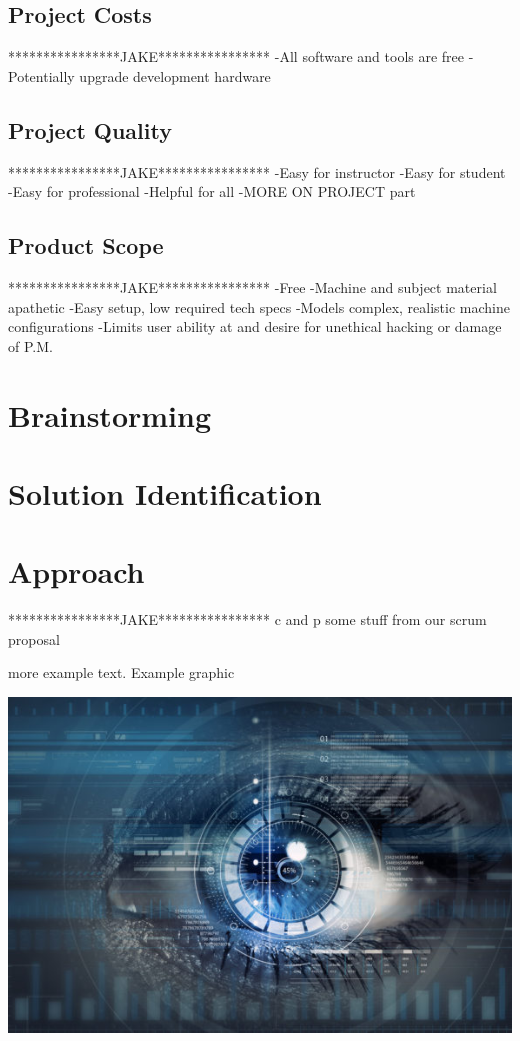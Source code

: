 \documentclass[openright]{report}
\begin{document}
\subsection{Project Costs}
****************JAKE****************
-All software and tools are free
-Potentially upgrade development hardware

\subsection{Project Quality}
****************JAKE****************
-Easy for instructor
-Easy for student
-Easy for professional
-Helpful for all
-MORE ON PROJECT part

\subsection{Product Scope}
****************JAKE****************
-Free
-Machine and subject material apathetic
-Easy setup, low required tech specs
-Models complex, realistic machine configurations
-Limits user ability at and desire for unethical hacking or damage of P.M.

\section{Brainstorming}

\par 

\section{Solution Identification}

\section{Approach}
****************JAKE****************
c and p some stuff from our scrum proposal

\par more example text\cite{ibrahiminterview}. Example graphic

\begin{center}
    \includegraphics[scale=1]{images/cyber.jpg}
\end{center}






\listoffigures
\cleardoublepage
\end{document}
